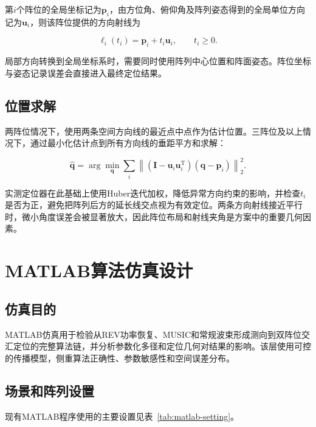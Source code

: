 \documentclass[UTF8,a4paper,12pt]{ctexart}
\newcommand{\vect}[1]{\boldsymbol{#1}}
\begin{document}
第$i$个阵位的全局坐标记为$\vect p_i$，由方位角、俯仰角及阵列姿态得到的全局单位方向记为$\vect u_i$，则该阵位提供的方向射线为

\begin{equation}
  \vect \ell_i(t_i)=\vect p_i+t_i\vect u_i,\qquad t_i\geq 0.
\end{equation}

局部方向转换到全局坐标系时，需要同时使用阵列中心位置和阵面姿态。阵位坐标与姿态记录误差会直接进入最终定位结果。

\subsection{位置求解}

两阵位情况下，使用两条空间方向线的最近点中点作为估计位置。三阵位及以上情况下，通过最小化估计点到所有方向线的垂距平方和求解：

\begin{equation}
  \widehat{\vect q}=
  \arg\min_{\vect q}
  \sum_i \left\|
  \left(\vect I-\vect u_i\vect u_i^{\mathrm T}\right)
  (\vect q-\vect p_i)
  \right\|_2^2.
\end{equation}

实测定位器在此基础上使用Huber迭代加权，降低异常方向约束的影响，并检查$t_i$是否为正，避免把阵列后方的延长线交点视为有效定位。两条方向射线接近平行时，微小角度误差会被显著放大，因此阵位布局和射线夹角是方案中的重要几何因素。

\section{MATLAB算法仿真设计}

\subsection{仿真目的}

MATLAB仿真用于检验从REV功率恢复、MUSIC和常规波束形成测向到双阵位交汇定位的完整算法链，并分析参数化多径和定位几何对结果的影响。该层使用可控的传播模型，侧重算法正确性、参数敏感性和空间误差分布。

\subsection{场景和阵列设置}

现有MATLAB程序使用的主要设置见表~\ref{tab:matlab-setting}。
\end{document}
